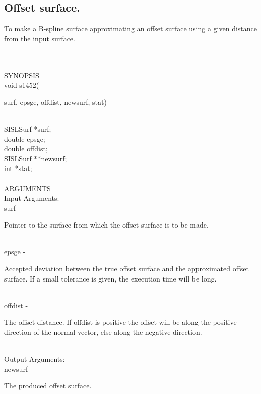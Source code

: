 \subsection{Offset surface.}
\begin{minipg1}
To make a B-spline surface approximating an offset surface using a given distance from the input surface.
\end{minipg1} \\ \\
SYNOPSIS\\
	\>void s1452(\begin{minipg3}
				{\fov surf}, {\fov epsge}, {\fov offdist}, {\fov newsurf}, {\fov stat})
		\end{minipg3}\\[0.3ex]

		\>\>	SISLSurf	\> 	*{\fov surf};\\
		\>\>	double	\>	{\fov epsge};\\
		\>\>	double	\>	{\fov offdist};\\
		\>\>	SISLSurf	\>	**{\fov newsurf};\\
		\>\>	int 	\>	*{\fov stat};\\
\\
ARGUMENTS\\
	\>Input Arguments:\\
	\>\>	{\fov surf}\> - \>	\begin{minipg2}
			Pointer to the surface from which the offset surface is to be made.
				\end{minipg2}\\[0.8ex]
	\>\>	{\fov epsge}\> - \>	\begin{minipg2}
			Accepted deviation between the true offset surface and the approximated 
			offset surface. If a small tolerance is 
			given, the execution time will be long.
				\end{minipg2}\\[0.3ex]
	\>\>	{\fov offdist}\> - \>	\begin{minipg2}
				The offset distance. If offdist is 
				positive the offset will be along the 
				positive direction of the normal vector, 
				else along the negative 
				direction.	
				\end{minipg2}\\[0.3ex]
	\>Output Arguments:\\
	\>\>	{\fov newsurf}\> - \>	\begin{minipg2}
				The produced offset surface.	
				\end{minipg2}\\

